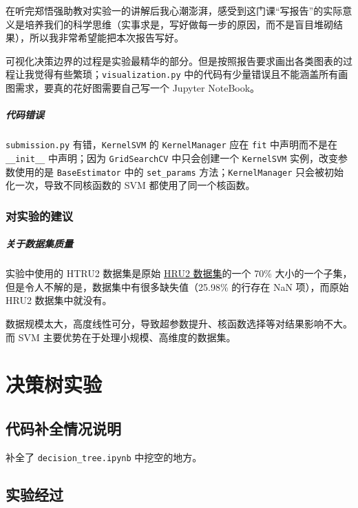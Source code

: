 \documentclass[oneside]{ctexbook}
\begin{document}
在听完郑悟强助教对实验一的讲解后我心潮澎湃，感受到这门课“写报告”的实际意义是培养我们的科学思维（实事求是，写好做每一步的原因，而不是盲目堆砌结果），所以我非常希望能把本次报告写好。

可视化决策边界的过程是实验最精华的部分。但是按照报告要求画出各类图表的过程让我觉得有些繁琐；\verb|visualization.py| 中的代码有少量错误且不能涵盖所有画图需求，要真的花好图需要自己写一个 Jupyter NoteBook。

\paragraph{代码错误} \verb|submission.py| 有错，\verb|KernelSVM| 的 \verb|KernelManager| 应在 \verb|fit| 中声明而不是在 \verb|__init__| 中声明；因为 \verb|GridSearchCV| 中只会创建一个 \verb|KernelSVM| 实例，改变参数使用的是 \verb|BaseEstimator| 中的 \verb|set_params| 方法；\verb|KernelManager| 只会被初始化一次，导致不同核函数的 SVM 都使用了同一个核函数。

\subsection{对实验的建议}

\paragraph{关于数据集质量} \label{para:about-dataset-quality}

实验中使用的 HTRU2 数据集是原始 \href{https://archive.ics.uci.edu/dataset/372/htru2}{HRU2 数据集}的一个 70\% 大小的一个子集，但是令人不解的是，数据集中有很多缺失值（25.98\% 的行存在 NaN 项），而原始 HRU2 数据集中就没有。

数据规模太大，高度线性可分，导致超参数提升、核函数选择等对结果影响不大。而 SVM 主要优势在于处理小规模、高维度的数据集。

\chapter{决策树实验}

\section{代码补全情况说明}

补全了 \verb|decision_tree.ipynb| 中挖空的地方。

\section{实验经过}
\end{document}
